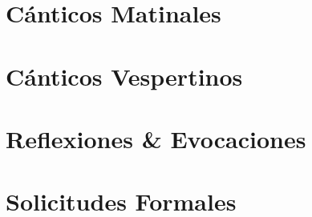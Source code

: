 
\morningPartSettings

\part{Cánticos Matinales}

\morningChapterSettings



\morningSettingsRestore

\eveningPartSettings

\part{Cánticos Vespertinos}

\eveningChapterSettings



\eveningSettingsRestore


\part{Reflexiones \& Evocaciones}





\requestsPartSettings


\part{Solicitudes Formales}

\requestsChapterSettings



\requestsSettingsRestore
